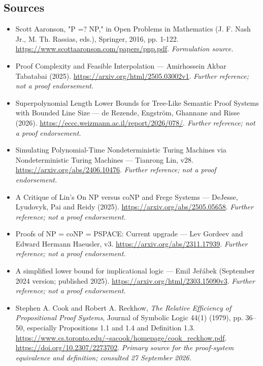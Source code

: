 \documentclass[11pt]{article}
\begin{document}
\subsection{Sources}
\begin{itemize}
\item[S1]Scott Aaronson, "P =? NP," in Open Problems in Mathematics (J. F. Nash Jr., M. Th. Rassias, eds.), Springer, 2016, pp. 1-122.
\url{https://www.scottaaronson.com/papers/pnp.pdf}.
\textit{Formulation source.}
\item[S2]Proof Complexity and Feasible Interpolation — Amirhossein Akbar Tabatabai (2025).
\url{https://arxiv.org/html/2505.03002v1}.
\textit{Further reference; not a proof endorsement.}
\item[S3]Superpolynomial Length Lower Bounds for Tree-Like Semantic Proof Systems with Bounded Line Size — de Rezende, Engström, Ghannane and Risse (2026).
\url{https://eccc.weizmann.ac.il/report/2026/078/}.
\textit{Further reference; not a proof endorsement.}
\item[S4]Simulating Polynomial-Time Nondeterministic Turing Machines via Nondeterministic Turing Machines — Tianrong Lin, v28.
\url{https://arxiv.org/abs/2406.10476}.
\textit{Further reference; not a proof endorsement.}
\item[S5]A Critique of Lin's On NP versus coNP and Frege Systems — DeJesse, Lyudovyk, Pai and Reidy (2025).
\url{https://arxiv.org/abs/2505.05658}.
\textit{Further reference; not a proof endorsement.}
\item[S6]Proofs of NP = coNP = PSPACE: Current upgrade — Lev Gordeev and Edward Hermann Haeusler, v3.
\url{https://arxiv.org/abs/2311.17939}.
\textit{Further reference; not a proof endorsement.}
\item[S7]A simplified lower bound for implicational logic — Emil Jeřábek (September 2024 version; published 2025).
\url{https://arxiv.org/html/2303.15090v3}.
\textit{Further reference; not a proof endorsement.}
\item[E1]Stephen A. Cook and Robert A. Reckhow,
\emph{The Relative Efficiency of Propositional Proof Systems},
Journal of Symbolic Logic 44(1) (1979), pp. 36--50, especially
Propositions 1.1 and 1.4 and Definition 1.3.
\url{https://www.cs.toronto.edu/~sacook/homepage/cook_reckhow.pdf}.
\url{https://doi.org/10.2307/2273702}.
\textit{Primary source for the proof-system equivalence and definition;
consulted 27 September 2026.}
\end{itemize}
\end{document}
